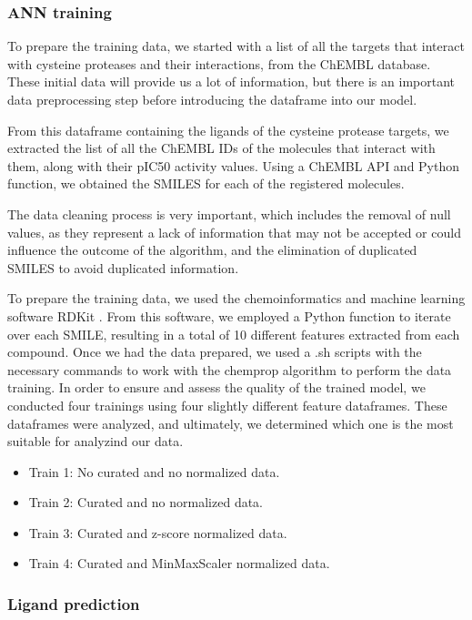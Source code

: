 \documentclass[final,times,twocolumn,article]{elsarticle}
\begin{document}
\subsubsection{ANN training}

To prepare the training data, we started with a list of all the targets that interact with cysteine proteases and their interactions, from the ChEMBL database. These initial data will provide us a lot of information, but there is an important data preprocessing step before introducing the dataframe into our model. 

From this dataframe containing the ligands of the cysteine protease targets, we extracted the list of all the ChEMBL IDs of the molecules that interact with them, along with their pIC50 activity values. Using a ChEMBL API and Python function, we obtained the SMILES for each of the registered molecules. 

The data cleaning process is very important, which includes the removal of null values, as they represent a lack of information that may not be accepted or could influence the outcome of the algorithm, and the elimination of duplicated SMILES to avoid duplicated information. 

To prepare the training data, we used the chemoinformatics and machine learning software RDKit \cite{rdkitweb}. From this software, we employed a Python function to iterate over each SMILE, resulting in a total of 10 different features extracted from each compound. Once we had the data prepared, we used a .sh scripts with the necessary commands to work with the chemprop algorithm to perform the data training. 
In order to ensure and assess the quality of the trained model, we conducted four trainings using four slightly different feature dataframes. These dataframes were analyzed, and ultimately, we determined which one is the most suitable for analyzind our data. 

\begin{itemize}
\item Train 1: No curated and no normalized data.
\item Train 2: Curated and no normalized data.
\item Train 3: Curated and z-score normalized data.
\item Train 4: Curated and MinMaxScaler normalized data.
\end{itemize}
\subsubsection{Ligand prediction}
\end{document}
